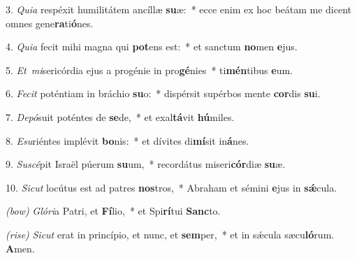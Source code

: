 3. \textit{Quia} respéxit humilitátem ancíllæ \textbf{su}æ:~* ecce enim ex hoc beátam me dicent omnes gene\textbf{ra}ti\textbf{ó}nes.

4. \textit{Quia} fecit mihi magna qui \textbf{pot}ens est:~* et sanctum \textbf{no}men \textbf{e}jus.

5. \textit{Et\ mi}sericórdia ejus a progénie in pro\textbf{gé}nies~* ti\textbf{mén}tibus \textbf{e}um.

6. \textit{Fecit} poténtiam in bráchio \textbf{su}o:~* dispérsit supérbos mente \textbf{cor}dis \textbf{su}i.

7. \textit{Depó}suit poténtes de \textbf{se}de,~* et exal\textbf{tá}vit \textbf{hú}miles.

8. \textit{Esu}riéntes implévit \textbf{bo}nis:~* et dívites di\textbf{mí}sit in\textbf{á}nes.

9. \textit{Suscé}pit Israël púerum \textbf{su}um,~* recordátus miseri\textbf{cór}diæ \textbf{su}æ.

10. \textit{Sicut} locútus est ad patres \textbf{nos}tros,~* Abraham et sémini \textbf{e}jus in \textbf{s\'{\ae}}cula.

{\color{red}\textit{(bow)}} \textit{Glóri}a Patri, et \textbf{Fí}lio,~* et Spi\textbf{rí}tui \textbf{Sanc}to.

{\color{red}\textit{(rise)}} \textit{Sicut} erat in princípio, et nunc, et \textbf{sem}per,~* et in s\'{\ae}cula sæcu\textbf{ló}rum. \textbf{A}men.